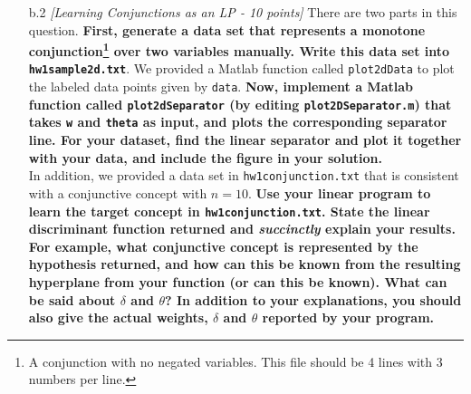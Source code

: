 \begin{enumerate}
\begin{enumerate}
\begin{enumerate}
      {\bf Now, implement     
      a Matlab function called {\tt findLinearDiscriminant}
      (by editing {\tt findLinearDiscriminant.m})
      to find a linear discriminant function that separates
      a given data set using the linear programming formulation described above} (you can refer to the appendix for a primer on solving linear programs using Matlab).
      Your Matlab function must take {\tt data} as input,
      and produce the linear separator, i.e., 
      the weights {\tt w} ($\vec{w}$), the threshold {\tt theta} ($\theta$), 
      and the value of the objective at the minimum, i.e., {\tt delta} ($\delta$).
      We will read our data from files. 
      A data file consists of lines that contain a sequence of binary values
      followed by either 1, indicating a positive label, or by -1, indicating a negative label.
      A sample line might be ``\verb+0 1 -1+'', which corresponds to
      $\vec{x}=[0,1]^T, y=-1$.
      In order to read files in this format,
      we provided a Matlab function called {\tt readFeatures}
      that takes a file name and the dimension of the feature vector $\vec{x}$ (denoted $n$)
      and returns an $m \times (n+1)$ matrix called {\tt data},
      where $m$ is the number of data points.

  \item [b.2] {\em [Learning Conjunctions as an LP - 10 points]} There are two parts 
    in this question. {\bf First, generate a data set that represents a 
      monotone conjunction\footnote{A conjunction with no negated variables.
      This file should be 4 lines with 3 numbers per line.} 
      over two variables manually. Write this data set into {\tt hw1sample2d.txt}}.
      We provided a Matlab function called {\tt plot2dData} to plot the labeled
      data points given by {\tt data}. 
      {\bf Now, implement
      a Matlab function called {\tt plot2dSeparator}
      (by editing {\tt plot2DSeparator.m}) that takes
      {\tt w} and {\tt theta} as input, and plots the corresponding separator line.
      For your dataset, find the linear separator and plot it together with your data,
      and include the figure in your solution.}
      \ \\

      In addition,
      we provided a data set in {\tt hw1conjunction.txt} that is consistent
      with a conjunctive concept with $n=10$.
      {\bf Use your linear program to learn the target concept in  {\tt hw1conjunction.txt}.
      State the linear discriminant function returned and {\em succinctly}
      explain your results. 
      For example, what conjunctive concept is
      represented by the hypothesis returned, and how can this be known
      from the resulting hyperplane from your function (or can this be
      known). What can be said about $\delta$ and $\theta$? In addition to your
      explanations, you should also give the actual weights, $\delta$ and
      $\theta$ reported by your program.}
      \ \\


\end{enumerate}
\end{enumerate}
\end{enumerate}
